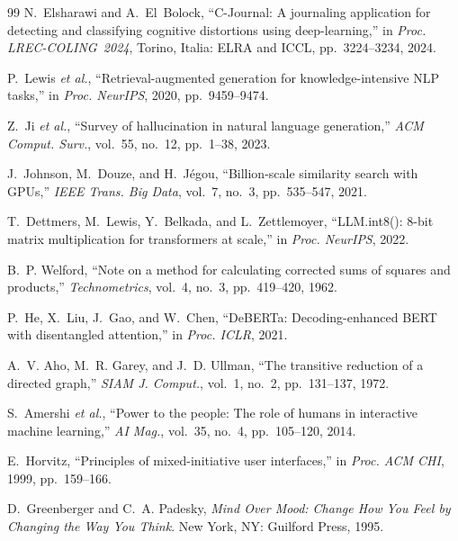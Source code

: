 \documentclass[12pt]{article}
\begin{document}
\begin{thebibliography}{99}
N.~Elsharawi and A.~El~Bolock,
``C-Journal: A journaling application for detecting and classifying cognitive distortions using deep-learning,''
in \textit{Proc. LREC-COLING~2024}, Torino, Italia: ELRA and ICCL, pp.~3224--3234, 2024.

P.~Lewis \textit{et al.},
``Retrieval-augmented generation for knowledge-intensive NLP tasks,''
in \textit{Proc. NeurIPS}, 2020, pp.~9459--9474.

Z.~Ji \textit{et al.},
``Survey of hallucination in natural language generation,''
\textit{ACM Comput. Surv.}, vol.~55, no.~12, pp.~1--38, 2023.

J.~Johnson, M.~Douze, and H.~J\'{e}gou,
``Billion-scale similarity search with GPUs,''
\textit{IEEE Trans. Big Data}, vol.~7, no.~3, pp.~535--547, 2021.

T.~Dettmers, M.~Lewis, Y.~Belkada, and L.~Zettlemoyer,
``LLM.int8(): 8-bit matrix multiplication for transformers at scale,''
in \textit{Proc. NeurIPS}, 2022.

B.~P. Welford,
``Note on a method for calculating corrected sums of squares and products,''
\textit{Technometrics}, vol.~4, no.~3, pp.~419--420, 1962.

P.~He, X.~Liu, J.~Gao, and W.~Chen,
``DeBERTa: Decoding-enhanced BERT with disentangled attention,''
in \textit{Proc. ICLR}, 2021.

A.~V. Aho, M.~R. Garey, and J.~D. Ullman,
``The transitive reduction of a directed graph,''
\textit{SIAM J. Comput.}, vol.~1, no.~2, pp.~131--137, 1972.

S.~Amershi \textit{et al.},
``Power to the people: The role of humans in interactive machine learning,''
\textit{AI Mag.}, vol.~35, no.~4, pp.~105--120, 2014.

E.~Horvitz,
``Principles of mixed-initiative user interfaces,''
in \textit{Proc. ACM CHI}, 1999, pp.~159--166.

D.~Greenberger and C.~A. Padesky,
\textit{Mind Over Mood: Change How You Feel by Changing the Way You Think}.
New York, NY: Guilford Press, 1995.

\end{thebibliography}
\end{document}
